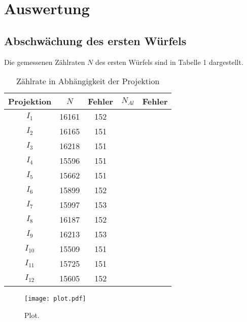\section{Auswertung}
\label{sec:Auswertung}



\subsection{Abschwächung des ersten Würfels}
Die gemessenen Zählraten $N$ des ersten Würfels sind in Tabelle 1 dargestellt.

\begin{table}[H]
  \centering
  \caption{Zählrate in Abhängigkeit der Projektion}
  \label{tab:Parameter}
  \begin{tabular}{c c c| c c }
    \toprule
    Projektion & $N$ & Fehler & $N_{Al}$ & Fehler  \\
    \midrule
        $I_1$    & 16161 & 152 & &   \\
        $I_2$    & 16165 & 151 & &   \\
        $I_3$    & 16218 & 151 & &   \\
        $I_4$    & 15596 & 151 & &   \\
        $I_5$    & 15662 & 151 & &   \\
        $I_6$    & 15899 & 152 & &   \\
        $I_7$    & 15997 & 153 & &   \\
        $I_8$    & 16187 & 152 & &   \\
        $I_9$    & 16213 & 153 & &   \\
        $I_{10}$ & 15509 & 151 & &  \\
        $I_{11}$ & 15725 & 151 & &   \\
        $I_{12}$ & 15605 & 152 & &   \\
    \bottomrule
  \end{tabular}
\end{table}



\begin{figure}
  \centering
  \texttt{[image: plot.pdf]}
  \caption{Plot.}
  \label{fig:plot}
\end{figure}
